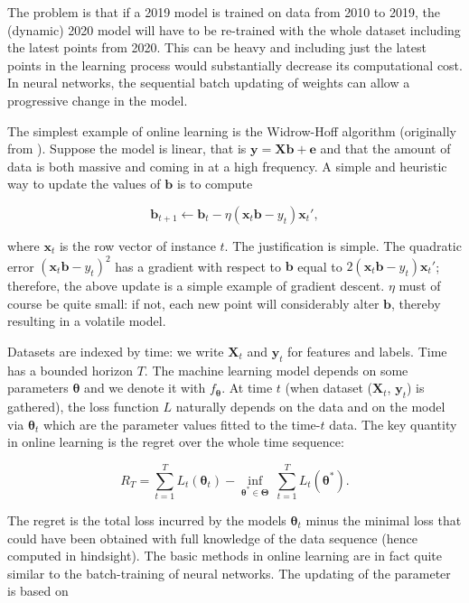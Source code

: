 The problem is that if a 2019 model is trained on data from 2010 to 2019, the (dynamic) 2020 model will have to be re-trained with the whole dataset including the latest points from 2020. This can be heavy and including just the latest points in the learning process would substantially decrease its computational cost. In neural networks, the sequential batch updating of weights can allow a progressive change in the model.

The simplest example of online learning is the Widrow-Hoff algorithm (originally from \cite{widrow1960adaptive}). Suppose the model is linear, that is $\textbf{y}=\textbf{Xb}+\textbf{e}$ and that the amount of data is both massive and coming in at a high frequency. A simple and heuristic way to update the values of $\textbf{b}$ is to compute

\begin{equation}
\textbf{b}_{t+1} \longleftarrow \textbf{b}_t-\eta (\textbf{x}_t\textbf{b}-y_t)\textbf{x}_t',
\end{equation}

where $\textbf{x}_t$ is the row vector of instance $t$. The justification is simple. The quadratic error $(\textbf{x}_t\textbf{b} -y_t)^2$ has a gradient with respect to $\textbf{b}$ equal to $2(\textbf{x}_t\textbf{b} -y_t)\textbf{x}_t'$; therefore, the above update is a simple example of gradient descent. $\eta$ must of course be quite small: if not, each new point will considerably alter $\textbf{b}$, thereby resulting in a volatile model.

Datasets are indexed by time: we write $\textbf{X}_t$ and $\textbf{y}_t$ for features and labels. Time has a bounded horizon $T$. The machine learning model depends on some parameters $\boldsymbol{\theta}$ and we denote it with $f_{\boldsymbol{\theta}}$. At time $t$ (when dataset ($\textbf{X}_t$, $\textbf{y}_t$) is gathered), the loss function $L$ naturally depends on the data and on the model via $\boldsymbol{\theta}_t$ which are the parameter values fitted to the time-$t$ data. The key quantity in online learning is the regret over the whole time sequence:

\begin{equation}
\label{eq:regret}
R_T=\sum_{t=1}^TL_t(\boldsymbol{\theta}_t)-\underset{\boldsymbol{\theta}^*\in \boldsymbol{\Theta}}{\inf} \ \sum_{t=1}^TL_t(\boldsymbol{\theta}^*).
\end{equation}

The regret is the total loss incurred by the models $\boldsymbol{\theta}_t$ minus the minimal loss that could have been obtained with full knowledge of the data sequence (hence computed in hindsight). The basic methods in online learning are in fact quite similar to the batch-training of neural networks. The updating of the parameter is based on

